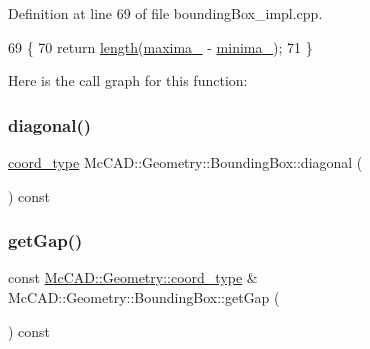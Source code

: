 Definition at line 69 of file bounding\+Box\+\_\+impl.\+cpp.


\begin{DoxyCode}
69                                         \{
70     \textcolor{keywordflow}{return} \hyperlink{namespaceMcCAD_1_1Geometry_ad2997914c766f1fc561cdd30032b6777}{length}(\hyperlink{classMcCAD_1_1Geometry_1_1BoundingBox_aa69d74a92caca3795ecd4089c3f71a87}{maxima\_} - \hyperlink{classMcCAD_1_1Geometry_1_1BoundingBox_a2fbfb7dc1c01528377da86ff313fc6e6}{minima\_});
71 \}
\end{DoxyCode}
Here is the call graph for this function\+:
\mbox{\label{classMcCAD_1_1Geometry_1_1BoundingBox_a2ffebee933ad8a3fa968a9f614cda1ea}} 
\subsubsection{\texorpdfstring{diagonal()}{diagonal()}\hspace{0.1cm}{\footnotesize\ttfamily [2/2]}}
{\footnotesize\ttfamily \hyperlink{namespaceMcCAD_1_1Geometry_ac043b37a4a7e849fca22869e1982d2f8}{coord\+\_\+type} Mc\+C\+A\+D\+::\+Geometry\+::\+Bounding\+Box\+::diagonal (\begin{DoxyParamCaption}{ }\end{DoxyParamCaption}) const}

\mbox{\label{classMcCAD_1_1Geometry_1_1BoundingBox_a9463a92bf72696016011e2bcd967b8de}} 
\subsubsection{\texorpdfstring{get\+Gap()}{getGap()}\hspace{0.1cm}{\footnotesize\ttfamily [1/2]}}
{\footnotesize\ttfamily const \hyperlink{namespaceMcCAD_1_1Geometry_ac043b37a4a7e849fca22869e1982d2f8}{Mc\+C\+A\+D\+::\+Geometry\+::coord\+\_\+type} \& Mc\+C\+A\+D\+::\+Geometry\+::\+Bounding\+Box\+::get\+Gap (\begin{DoxyParamCaption}{ }\end{DoxyParamCaption}) const}



